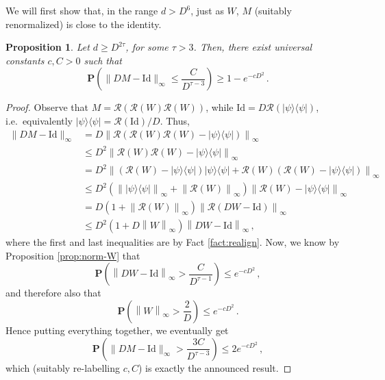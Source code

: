 \documentclass{amsart}
\newtheorem{proposition}[theorem]{Proposition}
\renewcommand{\P}{\mathbf{P}}
\renewcommand{\leq}{\leqslant}
\renewcommand{\geq}{\geqslant}
\newcommand{\Id}{\mathrm{Id}}
\newcommand{\ketbra}[2]{| #1 \rangle\!\langle #2 |}
\begin{document}
We will first show that, in the range $d>D^6$, just as $W$, $M$ (suitably renormalized) is close to the identity.

\begin{proposition} \label{prop:norm-M}
    Let $d\geq D^{2\tau}$, for some $\tau>3$. Then, there exist universal constants $c,C>0$ such that
    \[ \P\left( \|DM-\Id\|_{\infty} \leq \frac{C}{D^{\tau-3}} \right) \geq 1-e^{-cD^2} \, . \]
\end{proposition}

\begin{proof}
    Observe that $M=\mathcal{R}\left(\mathcal{R}(W)\mathcal{R}(W)\right)$, while $\Id=D\mathcal{R}(\ketbra{\psi}{\psi})$, i.e.~equivalently $\ketbra{\psi}{\psi}=\mathcal{R}(\Id)/D$. Thus,
    \begin{align*}
        \|DM-\Id\|_{\infty} & = D \left\| \mathcal{R}\left(\mathcal{R}(W)\mathcal{R}(W)-\ketbra{\psi}{\psi}\right) \right\|_{\infty}                                                                       \\
                            & \leq D^2 \left\| \mathcal{R}(W)\mathcal{R}(W)-\ketbra{\psi}{\psi} \right\|_{\infty}                                                                                          \\
                            & = D^2 \left\| \left(\mathcal{R}(W)-\ketbra{\psi}{\psi}\right) \ketbra{\psi}{\psi} + \mathcal{R}(W) \left(\mathcal{R}(W)-\ketbra{\psi}{\psi}\right) \right\|_{\infty}         \\
                            & \leq D^2 \left( \left\|\ketbra{\psi}{\psi} \right\|_{\infty} + \left\| \mathcal{R}(W) \right\|_{\infty} \right) \left\| \mathcal{R}(W)-\ketbra{\psi}{\psi} \right\|_{\infty} \\
                            & = D \left( 1 + \left\| \mathcal{R}(W) \right\|_{\infty} \right) \left\| \mathcal{R}(DW-\Id) \right\|_{\infty}                                                                \\
                            & \leq D^2 \left( 1 + D \left\| W \right\|_{\infty} \right) \left\| DW-\Id \right\|_{\infty} \, ,
    \end{align*}
    where the first and last inequalities are by Fact \ref{fact:realign}. Now, we know by Proposition \ref{prop:norm-W} that
    \[ \P\left( \left\| DW-\Id \right\|_{\infty} > \frac{C}{D^{\tau -1}} \right) \leq e^{-cD^2} \, , \]
    and therefore also that
    \[ \P\left( \left\| W \right\|_{\infty} > \frac{2}{D} \right) \leq e^{-cD^2} \, . \]
    Hence putting everything together, we eventually get
    \[ \P\left( \|DM-\Id\|_{\infty} > \frac{3C}{D^{\tau-3}} \right) \leq 2e^{-cD^2} \, , \]
    which (suitably re-labelling $c,C$) is exactly the announced result.
\end{proof}
\end{document}
